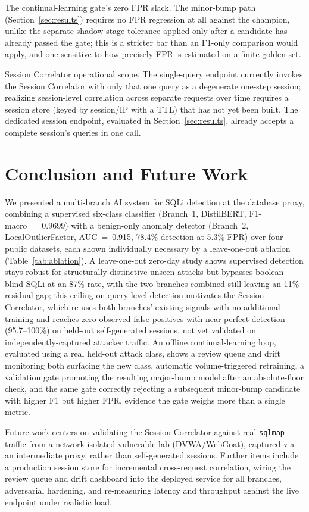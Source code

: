 \documentclass[conference]{IEEEtran}
\begin{document}
The continual-learning gate's zero FPR slack. The minor-bump path (Section~\ref{sec:results}) requires no FPR regression at all against the champion, unlike the separate shadow-stage tolerance applied only after a candidate has already passed the gate; this is a stricter bar than an F1-only comparison would apply, and one sensitive to how precisely FPR is estimated on a finite golden set.

Session Correlator operational scope. The single-query endpoint currently invokes the Session Correlator with only that one query as a degenerate one-step session; realizing session-level correlation across separate requests over time requires a session store (keyed by session/IP with a TTL) that has not yet been built. The dedicated session endpoint, evaluated in Section~\ref{sec:results}, already accepts a complete session's queries in one call.

\section{Conclusion and Future Work}\label{sec:conclusion}
We presented a multi-branch AI system for SQLi detection at the database proxy, combining a supervised six-class classifier (Branch~1, DistilBERT, F1-macro~=~0.9699) with a benign-only anomaly detector (Branch~2, LocalOutlierFactor, AUC~=~0.915, 78.4\% detection at 5.3\% FPR) over four public datasets, each shown individually necessary by a leave-one-out ablation (Table~\ref{tab:ablation}). A leave-one-out zero-day study shows supervised detection stays robust for structurally distinctive unseen attacks but bypasses boolean-blind SQLi at an 87\% rate, with the two branches combined still leaving an 11\% residual gap; this ceiling on query-level detection motivates the Session Correlator, which re-uses both branches' existing signals with no additional training and reaches zero observed false positives with near-perfect detection (95.7--100\%) on held-out self-generated sessions, not yet validated on independently-captured attacker traffic. An offline continual-learning loop, evaluated using a real held-out attack class, shows a review queue and drift monitoring both surfacing the new class, automatic volume-triggered retraining, a validation gate promoting the resulting major-bump model after an absolute-floor check, and the same gate correctly rejecting a subsequent minor-bump candidate with higher F1 but higher FPR, evidence the gate weighs more than a single metric.

Future work centers on validating the Session Correlator against real \texttt{sqlmap} traffic from a network-isolated vulnerable lab (DVWA/WebGoat), captured via an intermediate proxy, rather than self-generated sessions. Further items include a production session store for incremental cross-request correlation, wiring the review queue and drift dashboard into the deployed service for all branches, adversarial hardening, and re-measuring latency and throughput against the live endpoint under realistic load.
\end{document}

